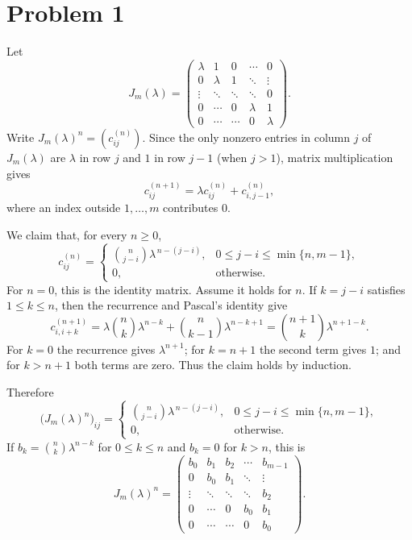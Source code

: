 \documentclass[11pt]{article}
\begin{document}
\section*{Problem 1}

Let
\[
J_m(\lambda)=
\begin{pmatrix}
\lambda&1&0&\cdots&0\\
0&\lambda&1&\ddots&\vdots\\
\vdots&\ddots&\ddots&\ddots&0\\
0&\cdots&0&\lambda&1\\
0&\cdots&\cdots&0&\lambda
\end{pmatrix}.
\]
Write $J_m(\lambda)^n=(c^{(n)}_{ij})$. Since the only nonzero entries
in column $j$ of $J_m(\lambda)$ are $\lambda$ in row $j$ and $1$ in
row $j-1$ (when $j>1$), matrix multiplication gives
\[
c^{(n+1)}_{ij}=\lambda c^{(n)}_{ij}+c^{(n)}_{i,j-1},
\]
where an index outside $1,\ldots,m$ contributes $0$.

We claim that, for every $n\geq0$,
\[
c^{(n)}_{ij}=\begin{cases}
\displaystyle\binom{n}{j-i}\lambda^{\,n-(j-i)},
&0\leq j-i\leq\min\{n,m-1\},\\[0.7em]
0,&\text{otherwise.}
\end{cases}
\]
For $n=0$, this is the identity matrix. Assume it holds for $n$. If
$k=j-i$ satisfies $1\leq k\leq n$, then the recurrence and Pascal's
identity give
\[
c^{(n+1)}_{i,i+k}
=\lambda\binom{n}{k}\lambda^{n-k}
 +\binom{n}{k-1}\lambda^{n-k+1}
=\binom{n+1}{k}\lambda^{n+1-k}.
\]
For $k=0$ the recurrence gives $\lambda^{n+1}$; for $k=n+1$ the
second term gives $1$; and for $k>n+1$ both terms are zero. Thus the
claim holds by induction.

Therefore
\[
\boxed{
\bigl(J_m(\lambda)^n\bigr)_{ij}
=\begin{cases}
\displaystyle\binom{n}{j-i}\lambda^{\,n-(j-i)},
&0\leq j-i\leq\min\{n,m-1\},\\[0.7em]
0,&\text{otherwise.}
\end{cases}}
\]
If $b_k=\binom{n}{k}\lambda^{n-k}$ for $0\leq k\leq n$ and $b_k=0$
for $k>n$, this is
\[
\boxed{
J_m(\lambda)^n=
\begin{pmatrix}
b_0&b_1&b_2&\cdots&b_{m-1}\\
0&b_0&b_1&\ddots&\vdots\\
\vdots&\ddots&\ddots&\ddots&b_2\\
0&\cdots&0&b_0&b_1\\
0&\cdots&\cdots&0&b_0
\end{pmatrix}.}
\]
\end{document}
